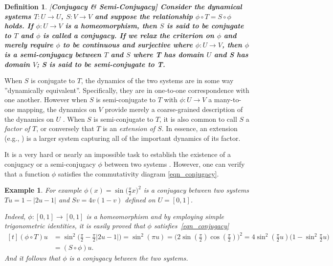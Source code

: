 \documentclass[a4paper,12pt,twoside]{report}
\newtheorem{Definition}{Definition}[]
\newtheorem{Example}{Example}[]
\begin{document}
\begin{Definition}\rm  
[\bf {Conjugacy \& Semi-Conjugacy}]\label{Dfn_Conjugate}\rm
   Consider the dynamical systems $T:U\to{U}$, $S:V\to{V}$ and suppose the relationship $\phi \circ T=S\circ \phi$ holds. If $\phi:U\to{V}$ is a homeomorphism, then $S$ is said to be conjugate to $T$ and $\phi$ is called a conjugacy. If we relax the criterion on $\phi$ and merely require $\phi$ to be continuous and surjective where $\phi:U\to{V}$, then $\phi$ is a semi-conjugacy between $T$ and $S$ where T has domain $U$ and S has domain $V$; S is said to be semi-conjugate to T. 
\end{Definition} 

When $S$ is conjugate to $T$, the dynamics of the two systems are in some way ''dynamically equivalent''. Specifically, they are in one-to-one correspondence with one another. However when $S$ is semi-conjugate to $T$ with $\phi:U\to{V}$ a many-to-one mapping, the dynamics on $V$ provide merely a coarse-grained description of the dynamics on $U$ \cite{de2013elements}. When $S$ is semi-conjugate to $T$, it is also common to call $S$ a \emph{factor of $T$}, or conversely that $T$ is an \emph{extension of $S$}. In essence, an extension (e.g., \cite{de2013elements}) is a larger system capturing all of the important dynamics of its factor.

It is a very hard or nearly an impossible task to establish the existence of a conjugacy or a semi-conjugacy $\phi$ between two systems \cite{devaney2018introduction}. However, one can verify that a function $\phi$ satisfies the commutativity diagram \ref{eqn_conjugacy}.  

\begin{Example}\rm
  For example $\phi(x)=\sin\big(\frac{\pi}{2}x\big)^2$ is a conjugacy between two systems $Tu=1-|2u-1|$ and $Sv=4v(1-v)$  defined on $U=[0,1]$.  

  Indeed, $\phi:[0,1]\to[0,1]$ is a homeomorphism and by employing simple trigonometric identities, it is easily proved that $\phi$ satisfies~\ref{eqn_conjugacy}
  \[
    \begin{aligned}[t]
      (\phi\circ{T})u 
                &=\sin^{2}\Big(\frac{\pi}{2} - \frac{\pi}{2}|2u-1|\Big) = \sin^{2}(\pi{u})=\Big(2\sin(\frac{\pi}{2})\cos(\frac{\pi}{2})\Big)^{2}=4\sin^{2}(\frac{\pi}{2}u)\Big(1-\sin^{2}\frac{\pi}{2}u\Big) \\
                                    &=({S}\circ\phi)u.
    \end{aligned}
\]
And it follows that $\phi$ is a conjugacy between the two systems.
\end{Example}
\end{document}
